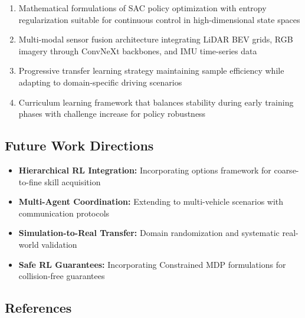 \documentclass[10pt,a4paper,twocolumn]{article}
\begin{document}
\begin{enumerate}
    \item Mathematical formulations of SAC policy optimization with entropy regularization suitable for continuous control in high-dimensional state spaces
    
    \item Multi-modal sensor fusion architecture integrating LiDAR BEV grids, RGB imagery through ConvNeXt backbones, and IMU time-series data
    
    \item Progressive transfer learning strategy maintaining sample efficiency while adapting to domain-specific driving scenarios
    
    \item Curriculum learning framework that balances stability during early training phases with challenge increase for policy robustness
\end{enumerate}

\subsection*{Future Work Directions}

\begin{itemize}
    \item \textbf{Hierarchical RL Integration:} Incorporating options framework for coarse-to-fine skill acquisition
    
    \item \textbf{Multi-Agent Coordination:} Extending to multi-vehicle scenarios with communication protocols
    
    \item \textbf{Simulation-to-Real Transfer:} Domain randomization and systematic real-world validation
    
    \item \textbf{Safe RL Guarantees:} Incorporating Constrained MDP formulations for collision-free guarantees
\end{itemize}

\vfill

\subsection*{References}
\end{document}
